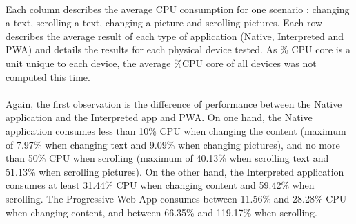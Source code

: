 \documentclass{kththesis}
\begin{document}
\begin{table}[h]
    \centering
    
    \caption{Average CPU usage (\% CPU core)}
    \label{tab:cpu}
\end{table}

\paragraph{}
Each column describes the average CPU consumption for one scenario : changing a text, scrolling a text, changing a picture and scrolling pictures. Each row describes the average result of each type of application (Native, Interpreted and PWA) and details the results for each physical device tested. As \% CPU core is a unit unique to each device, the average \%CPU core of all devices was not computed this time. 

\paragraph{}
Again, the first observation is the difference of performance between the Native application and the Interpreted app and PWA. On one hand, the Native application consumes less than 10\% CPU when changing the content (maximum of 7.97\% when changing text and 9.09\% when changing pictures), and no more than 50\% CPU when scrolling (maximum of 40.13\% when scrolling text and 51.13\% when scrolling pictures). On the other hand, the Interpreted application consumes at least 31.44\% CPU when changing content and 59.42\% when scrolling. The Progressive Web App consumes between 11.56\% and 28.28\% CPU when changing content, and between 66.35\% and 119.17\% when scrolling.
\end{document}
